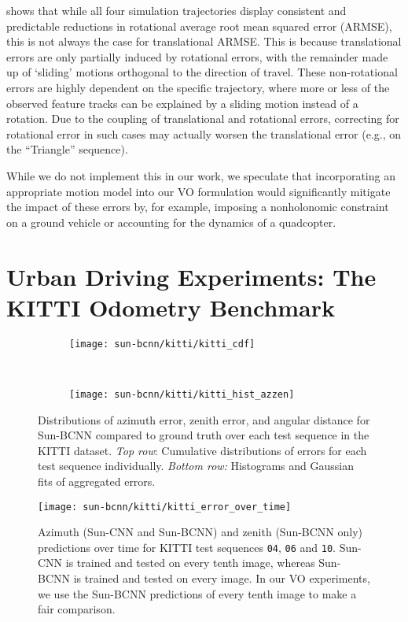  shows that while all four simulation trajectories display consistent and predictable reductions in rotational average root mean squared error (ARMSE), this is not always the case for translational ARMSE.
This is because translational errors are only partially induced by rotational errors, with the remainder made up of `sliding' motions orthogonal to the direction of travel.
These non-rotational errors are highly dependent on the specific trajectory, where more or less of the observed feature tracks can be explained by a sliding motion instead of a rotation.
Due to the coupling of translational and rotational errors, correcting for rotational error in such cases may actually worsen the translational error (e.g., on the ``Triangle'' sequence).

While we do not implement this in our work, we speculate that incorporating an appropriate motion model into our VO formulation would significantly mitigate the impact of these errors by, for example, imposing a nonholonomic constraint on a ground vehicle or accounting for the dynamics of a quadcopter.

\section{Urban Driving Experiments: The KITTI Odometry Benchmark}
\begin{figure}
    \centering
    \begin{subfigure}[b]{0.75\textwidth}
        \texttt{[image: sun-bcnn/kitti/kitti\_cdf]}
    \end{subfigure} ~
    \begin{subfigure}[b]{0.75\textwidth}
        \texttt{[image: sun-bcnn/kitti/kitti\_hist\_azzen]}
    \end{subfigure}
    \caption{Distributions of azimuth error, zenith error, and angular distance for Sun-BCNN compared to ground truth over each test sequence in the KITTI dataset. \emph{Top row}: Cumulative distributions of errors for each test sequence individually. \emph{Bottom row:} Histograms and Gaussian fits of aggregated errors.}
    \label{fig:sun-bcnn_kitti_cnn_testerrors}
\end{figure}

\begin{figure}
    \centering
    \texttt{[image: sun-bcnn/kitti/kitti\_error\_over\_time]}
    \caption{Azimuth (Sun-CNN and Sun-BCNN) and zenith (Sun-BCNN only) predictions over time for KITTI test sequences \texttt{04}, \texttt{06} and \texttt{10}. Sun-CNN is trained and tested on every tenth image, whereas Sun-BCNN is trained and tested on every image. In our VO experiments, we use the Sun-BCNN predictions of every tenth image to make a fair comparison. }
    \label{fig:sun-bcnn_kitti_error_over_time}
\end{figure}


